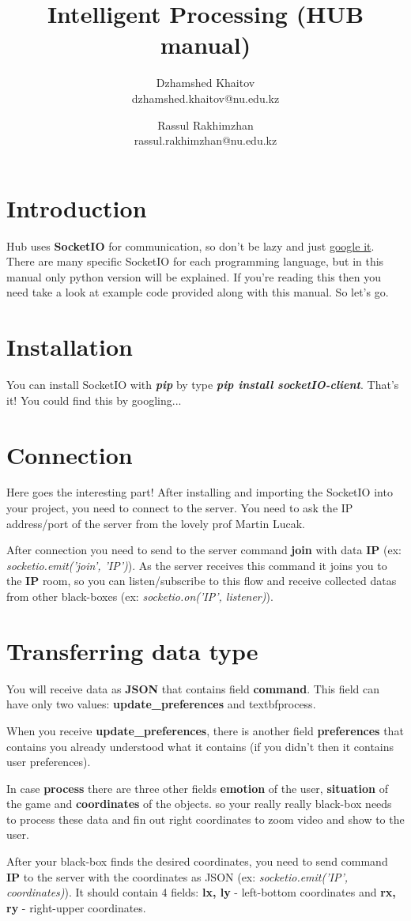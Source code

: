 \documentclass[10pt]{article}
\title {
	Intelligent Processing (HUB manual)
}
\date {}
\author {
	Dzhamshed Khaitov\\
	dzhamshed.khaitov@nu.edu.kz
	\and
	Rassul Rakhimzhan\\
	rassul.rakhimzhan@nu.edu.kz
}
\begin{document}
		
\maketitle

\section{Introduction}

Hub uses \textbf{SocketIO} for communication, so don't be lazy and just \href{http://www.justfuckinggoogleit.com/search/socketio}{google it}. There are many specific SocketIO for each programming language, but in this manual only python version will be explained. If you're reading this then you need take a look at example code provided along with this manual. So let's go.

\section{Installation}
You can install SocketIO with \textbf{\textit{pip}} by type \textbf{\textit{pip install socketIO-client}}. That's it! You could find this by googling...

\section{Connection}
Here goes the interesting part! After installing and importing the SocketIO into your project, you need to connect to the server. You need to ask the IP address/port of the server from the lovely prof Martin Lucak.
\par
After connection you need to send to the server command \textbf{join} with data \textbf{IP} (ex: \textit{socketio.emit('join', 'IP')}). As the server receives this command it joins you to the \textbf{IP} room, so you can listen/subscribe to this flow and receive collected datas from other black-boxes (ex: \textit{socketio.on('IP', listener)}).

\section{Transferring data type}
You will receive data as \textbf{JSON} that contains field \textbf{command}. This field can have only two values: \textbf{update\_preferences} and textbf{process}.
\par
When you receive \textbf{update\_preferences}, there is another field \textbf{preferences} that contains you already understood what it contains (if you didn't then it contains user preferences).
\par
In case \textbf{process} there are three other fields \textbf{emotion} of the user, \textbf{situation} of the game and \textbf{coordinates} of the objects. so your really really black-box needs to process these data and fin out right coordinates to zoom video and show to the user.
\par
After your black-box finds the desired coordinates, you need to send command \textbf{IP} to the server with the coordinates as JSON (ex: \textit{socketio.emit('IP', coordinates)}). It should contain 4 fields: \textbf{lx, ly} - left-bottom coordinates and \textbf{rx, ry} - right-upper coordinates.
\end{document}

